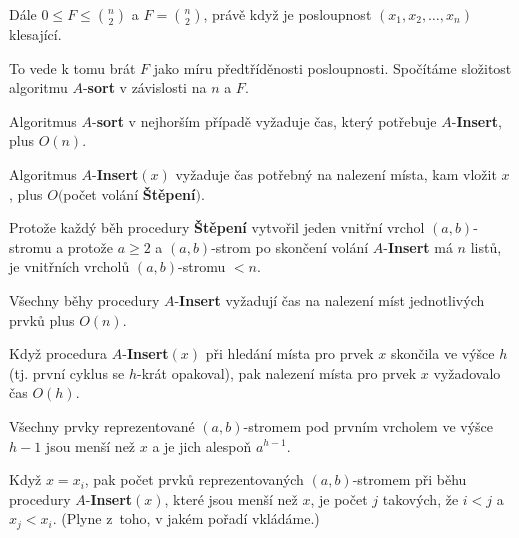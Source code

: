 \documentclass[a4paper,12pt]{article}
\begin{document}
Dále $0\le F\le\binom 
n2$ a $F=\binom n2$, právě 
když je posloupnost $(x_1,x_2,\dots,x_n)$ klesající. 

To vede k tomu 
brát $F$ jako míru předtříděnosti posloupnosti. Spočítáme 
složitost algoritmu $A$-{\bf sort} v závislosti na $n$ a $F$.

\begin{pozorovani}
    Algoritmus $A$-{\bf sort} v nejhorším případě vyžaduje čas, 
    který potřebuje $A$-{\bf Insert}, plus $O(n)$.
\end{pozorovani}

\begin{pozorovani}
    Algoritmus $
    A$-{\bf Insert$(x)$ }
    vyžaduje čas potřebný na nalezení místa, kam vložit $
    x$, plus 
    $O($po\-čet vo\-lá\-ní {\bf Štěpení}$)$.
\end{pozorovani}

\begin{pozorovani}
    Protože každý běh procedury 
    {\bf Ště\-pení} vytvořil jeden vnitřní vrchol $
    (a,b)$-stromu a protože $a\ge 2$ 
    a $(a,b)$-strom po skončení volání $A$-{\bf Insert} má $
    n$ listů, 
    je vnitřních vrcholů $(a,b)$-stromu $<n$.
\end{pozorovani}

\begin{pozorovani}
    Všechny 
běhy procedury $A$-{\bf Insert} vyžadují čas na nalezení míst 
jednotlivých prvků plus $O(n)$.
\end{pozorovani}

\begin{pozorovani}
    Když procedura 
    $A$-{\bf Insert$(x)$} při hledání místa pro prvek $x$ skončila ve výšce $
    h$ 
    (tj.  první cyklus se $h$-krát opakoval), pak nalezení místa pro 
    prvek $x$ vyžadovalo čas $O(h)$.
\end{pozorovani}

\begin{pozorovani}
    Všechny prvky reprezentované 
    $(a,b)$-stromem pod prvním vrcholem ve výšce $h-1$ jsou menší 
    než $x$ a je jich alespoň $a^{h-1}$.
\end{pozorovani}

\begin{pozorovani}
    Když $x=x_i$, pak počet 
prvků reprezentovaných $(a,b)$-stromem při běhu 
procedury $A$-{\bf Insert$(x)$}, které jsou menší než $
x$, je počet $j$ takových, že $i<j$ a $x_j<x_i$. (Plyne z~toho, v jakém pořadí vkládáme.)
\end{pozorovani}
\end{document}
